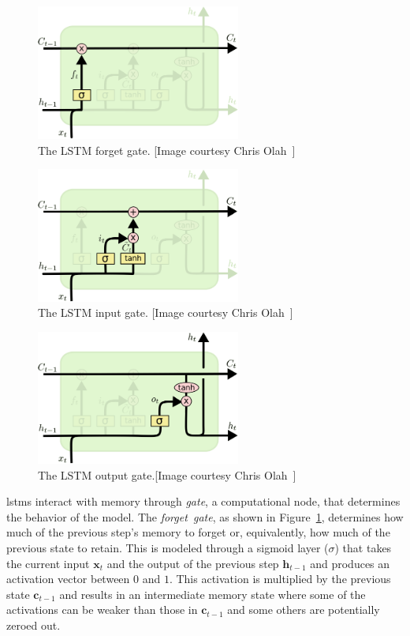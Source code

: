 \begin{figure}[p]
	\centering
	\includegraphics[width=0.6\textwidth]{figures/LSTM_forget_gate.pdf}
	\caption[The LSTM forget gate]
	{The LSTM forget gate. [Image courtesy Chris Olah~\cite{colah_15}]\label{fig:LSTM_forget_gate}}
\end{figure}
\begin{figure}[p]
	\centering
	\includegraphics[width=0.6\textwidth]{figures/LSTM_input_gate.pdf}
	\caption[The LSTM input gate]
	{The LSTM input gate. [Image courtesy Chris Olah~\cite{colah_15}]\label{fig:LSTM_input_gate}}
\end{figure}
\begin{figure}[p]
	\centering
	\includegraphics[width=0.6\textwidth]{figures/LSTM_output_gate.pdf}
	\caption[The LSTM output gate]
	{The LSTM output gate.[Image courtesy Chris Olah~\cite{colah_15}]\label{fig:LSTM_output_gate}}
\end{figure}

\gls{lstm}s interact with memory through \emph{gate}, a computational node, that determines the behavior of the model. The \emph{forget~gate}, as shown in Figure~\ref{fig:LSTM_forget_gate}, determines how much of the previous step's memory to forget or, equivalently, how much of the previous state to retain.  This is modeled through a sigmoid layer ($\sigma$) that takes the current input $\mathbf{x}_t$ and the output of the previous step $\mathbf{h}_{t-1}$ and produces an activation vector between $0$ and $1$.  This activation is multiplied by the previous state $\mathbf{c}_{t-1}$ and results in an intermediate memory state where some of the activations can be weaker than those in $\mathbf{c}_{t-1}$ and some others are potentially zeroed out.

